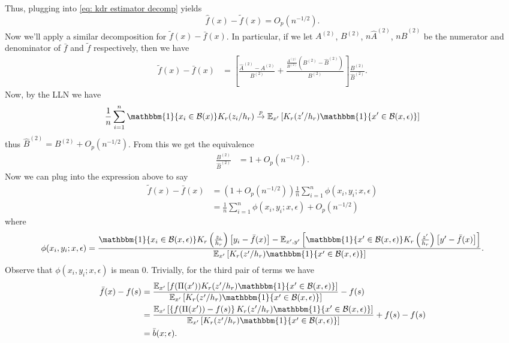 \documentclass[11pt]{article}
\begin{document}
Thus, plugging into \cref{eq: kdr estimator decomp} yields
\begin{equation}
    \hat{f}(x) - \tilde{f}(x) = O_p(n^{-1/2}).
\end{equation}
Now we'll apply a similar decomposition for $\tilde{f}(x) - \bar{f}(x)$. In particular, if we let $A^{(2)}$, $B^{(2)}$, $n\widehat{A}^{(2)}$, $n\widehat{B}^{(2)}$ be the numerator and denominator of $\bar{f}$ and $\tilde{f}$ respectively, then we have
\begin{align}
    \tilde{f}(x) - \bar{f}(x) &=  \left[\frac{\widehat{A}^{(2)}-A^{(2)}}{B^{(2)}} + \frac{\frac{A^{(2)}}{B^{(2)}}\left(B^{(2)} - \widehat{B}^{(2)}\right)}{B^{(2)}}\right]\frac{B^{(2)}}{\widehat{B}^{(2)}}. 
\end{align}
Now, by the LLN we have 
\begin{align}
    \frac{1}{n}\sum_{i = 1}^n \mathbbm{1}\{x_i \in \mathcal{B}(x)\}K_r(z_i/h_r) \overset{p}\rightarrow \mathbb{E}_{x'}\left[K_r(z'/h_r)\mathbbm{1}\{x'\in \mathcal{B}(x, \epsilon)\}\right]
\end{align}
thus $\widehat{B}^{(2)} = B^{(2)} + O_p(n^{-1/2})$. From this we get the equivalence
\begin{align}
    \frac{B^{(2)}}{\widehat{B}^{(2)}} &= 1 + O_p(n^{-1/2}).
\end{align}
Now we can plug into the expression above to say
\begin{align}
    \tilde{f}(x) - \bar{f}(x) &= \left(1 + O_p(n^{-1/2})\right)\frac{1}{n}\sum_{i = 1}^n\phi(x_i, y_i; x, \epsilon) \\
    &= \frac{1}{n}\sum_{i = 1}^n\phi(x_i, y_i; x, \epsilon) + O_p(n^{-1/2})
\end{align}
where 
\begin{equation*}
    \phi(x_i, y_i; x, \epsilon) = \frac{\mathbbm{1}\{x_i \in \mathcal{B}(x, \epsilon)\}K_r\left(\frac{z_i}{h_r}\right)\left[y_i - \bar{f}(x)\right] - \mathbb{E}_{x', y'}\left[\mathbbm{1}\{x' \in \mathcal{B}(x, \epsilon)\}K_r\left(\frac{z'}{h_r}\right)\left[y' - \bar{f}(x)\right]\right]}{\mathbb{E}_{x'}\left[K_r(z'/h_r)\mathbbm{1}\{x'\in \mathcal{B}(x, \epsilon)\}\right]}.
\end{equation*}
Observe that $\phi(x_i, y_i; x, \epsilon)$ is mean $0$. 
Trivially, for the third pair of terms we have
\begin{align}
    \bar{f}(x) - f(s) &= \frac{\mathbb{E}_{x'}\left[f(\Pi(x'))K_r(z'/h_r)\mathbbm{1}\{x'\in \mathcal{B}(x, \epsilon)\}\right]}{\mathbb{E}_{x'}\left[K_r(z'/h_r)\mathbbm{1}\{x'\in \mathcal{B}(x, \epsilon)\}\right]} - f(s) \\
    &= \frac{\mathbb{E}_{x'}\left[\left\{f(\Pi(x')) - f(s)\right\}K_r(z'/h_r)\mathbbm{1}\{x'\in \mathcal{B}(x, \epsilon)\}\right]}{\mathbb{E}_{x'}\left[K_r(z'/h_r)\mathbbm{1}\{x'\in \mathcal{B}(x, \epsilon)\}\right]} + f(s) - f(s) \\
    &= \bar{b}(x; \epsilon).
\end{align}
\end{document}
